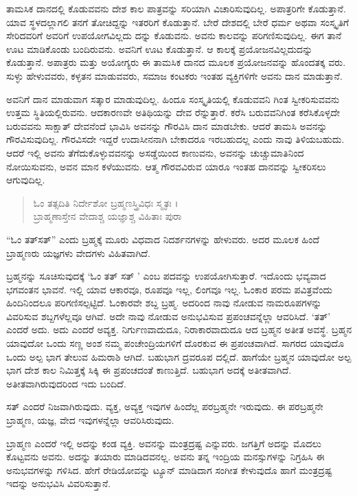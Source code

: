 ತಾಮಸಿಕ ದಾನದಲ್ಲಿ ಕೊಡುವವನು ದೇಶ ಕಾಲ ಪಾತ್ರವನ್ನು ಸರಿಯಾಗಿ ವಿಚಾರಿಸುವುದಿಲ್ಲ. ಅಪಾತ್ರರಿಗೇ ಕೊಡುತ್ತಾನೆ. ಯಾವ ಸ್ಥಳದಲ್ಲಾಗಲಿ ತನಗೆ ತೋಚಿದ್ದನ್ನು ಇತರರಿಗೆ ಕೊಡುತ್ತಾನೆ. ಬೇರೆ ದೇಶದಲ್ಲಿ ಬೇರೆ ಧರ್ಮ ಅಥವಾ ಸಂಸ್ಕೃತಿಗೆ ಸೇರಿದವರಿಗೆ ಅವರಿಗೆ ಉಪಯೋಗವಿಲ್ಲದು ದನ್ನು ಕೊಡುವನು. ಅವನು ಕಾಲವನ್ನು ಪರಿಗಣಿಸುವುದಿಲ್ಲ. ಈಗ ತಾನೆ ಊಟ ಮಾಡಿಕೊಂಡು ಬಂದಿರುವನು. ಅವನಿಗೆ ಊಟ ಕೊಡುತ್ತಾನೆ. ಆ ಕಾಲಕ್ಕೆ ಪ್ರಯೋಜನವಿಲ್ಲದುದನ್ನು ಕೊಡುತ್ತಾನೆ. ಅಪಾತ್ರರು ಮತ್ತು ಅಯೋಗ್ಯರು ಈ ತಾಮಸಿಕ ದಾನದ ಮೂಲಕ ಪ್ರಯೋಜನವನ್ನು ಹೊಂದತಕ್ಕ ವರು. ಸುಳ್ಳು ಹೇಳುವವರು, ಕಳ್ಳತನ ಮಾಡುವವರು, ಸಮಾಜ ಕಂಟಕರು ಇಂತಹ ವ್ಯಕ್ತಿಗಳಿಗೇ ಅವನು ದಾನ ಮಾಡುತ್ತಾನೆ.

ಅವನಿಗೆ ದಾನ ಮಾಡುವಾಗ ಸತ್ಕಾರ ಮಾಡುವುದಿಲ್ಲ. ಹಿಂದೂ ಸಂಸ್ಕೃತಿಯಲ್ಲಿ ಕೊಡುವವನಿ ಗಿಂತ ಸ್ವೀಕರಿಸುವವನು ಉತ್ತಮ ಸ್ಥಿತಿಯಲ್ಲಿರುವನು. ಆದಕಾರಣವೇ ಅತಿಥಿಯನ್ನು ದೇವ ರೆನ್ನುತ್ತಾರೆ. ಕರೆಸಿ ಬರುವವನಿಗಿಂತ ಕರೆಸಿಕೊಳ್ಳದೇ ಬರುವವನು ಸಾಕ್ಷಾತ್ ದೇವನೆಂದೆ ಭಾವಿಸಿ ಅವನನ್ನು ಗೌರವಿಸಿ ದಾನ ಮಾಡಬೇಕು. ಆದರೆ ತಾಮಸಿ ಅವನನ್ನು ಗೌರವಿಸುವುದಿಲ್ಲ. ಗೌರವಿಸದೇ ಇದ್ದರೆ ಉದಾಸೀನನಾಗಿ ಬೇಕಾದರೂ ಇರಬಹುದಲ್ಲ ಎಂದು ನಾವು ತಿಳಿಯಬಹುದು. ಆದರೆ ಇಲ್ಲಿ ಅವನು ತೆಗೆದುಕೊಳ್ಳುವವನನ್ನು ಅಸಡ್ಡೆಯಿಂದ ಕಾಣುವನು, ಅವನನ್ನು ಚುಚ್ಚುಮಾತಿನಿಂದ ನೋಯಿಸುವನು, ಅವನ ಮಾನ ಕಳೆಯುವನು. ಆತ್ಮ ಗೌರವವಿರುವ ಯಾರೂ ಇಂತಹ ದಾನವನ್ನು ಸ್ವೀಕರಿಸಲು ಆಗುವುದಿಲ್ಲ.

\begin{verse}
ಓಂ ತತ್ಸದಿತಿ ನಿರ್ದೇಶೋ ಬ್ರಹ್ಮಣಸ್ತ್ರಿವಿಧಃ ಸ್ಮೃತಃ ।\\ಬ್ರಾಹ್ಮಣಾಸ್ತೇನ ವೇದಾಶ್ಚ ಯಜ್ಞಾಶ್ಚ ವಿಹಿತಾಃ ಪುರಾ 
\end{verse}

{\small “ಓಂ ತತ್​ಸತ್​” ಎಂದು ಬ್ರಹ್ಮಕ್ಕೆ ಮೂರು ವಿಧವಾದ ನಿದರ್ಶನಗಳನ್ನು ಹೇಳುವರು. ಅದರ ಮೂಲಕ ಹಿಂದೆ ಬ್ರಾಹ್ಮಣರು ಯಜ್ಞಗಳು ವೇದಗಳು ವಿಹಿತವಾಗಿದೆ.}

ಬ್ರಹ್ಮನನ್ನು ಸೂಚಿಸುವುದಕ್ಕೆ ‘ಓಂ ತತ್ ಸತ್ ’ ಎಂಬ ಪದವನ್ನು ಉಪಯೋಗಿಸುತ್ತಾರೆ. ಇದೊಂದು ಭವ್ಯವಾದ ಭಗವಂತನ ಭಾವನೆ. ಇಲ್ಲಿ ಯಾವ ಆಕಾರವೂ, ರೂಪವೂ ಇಲ್ಲ, ಲಿಂಗವೂ ಇಲ್ಲ. ಓಂಕಾರ ಪರಮ ಪವಿತ್ರವೆಂದು ಹಿಂದಿನಿಂದಲೂ ಪರಿಗಣಿಸಲ್ಪಟ್ಟಿದೆ. ಓಂಕಾರವೇ ಶಬ್ದ ಬ್ರಹ್ಮ. ಅದರಿಂದ ನಾವು ನೋಡುವ ನಾಮರೂಪಗಳನ್ನು ವಿವರಿಸುವ ಶಬ್ದಗಳೆಲ್ಲವೂ ಆಗಿವೆ. ಅದೇ ನಾವು ನೋಡುವ ಅನುಭವಿಸುವ ಪ್ರಪಂಚವನ್ನೆಲ್ಲಾ ಆವರಿಸಿದೆ. ‘ತತ್​’ ಎಂದರೆ ಅದು. ಅದು ಎಂದರೆ ಅವ್ಯಕ್ತ. ನಿರ್ಗುಣವಾದುದೂ, ನಿರಾಕಾರವಾದುದೂ ಆದ ಬ್ರಹ್ಮನ ಅತೀತ ಅವಸ್ಥೆ. ಬ್ರಹ್ಮನ ಯಾವುದೋ ಒಂದು ಸಣ್ಣ ಅಂಶ ನಮ್ಮ ಪಂಚೇಂದ್ರಿಯಗಳಿಗೆ ದೊರಕುವ ಈ ಪ್ರಪಂಚವಾಗಿದೆ. ಸಾಗರದ ಯಾವುದೊ ಒಂದು ಅಲ್ಪ ಭಾಗ ತೇಲುವ ಹಿಮರಾಶಿ ಆಗಿದೆ. ಬಹುಭಾಗ ದ್ರವರೂಪ ದಲ್ಲಿದೆ. ಹಾಗೆಯೇ ಬ್ರಹ್ಮನ ಯಾವುದೋ ಅಲ್ಪ ಭಾಗ ದೇಶ ಕಾಲ ನಿಮಿತ್ತಕ್ಕೆ ಸಿಕ್ಕಿ ಈ ಪ್ರಪಂಚದಂತೆ ಕಾಣುತ್ತಿದೆ. ಬಹುಭಾಗ ಅದಕ್ಕೆ ಅತೀತವಾಗಿದೆ. ಅತೀತವಾಗಿರುವುದರಿಂದ ಇದು ಬಂದಿದೆ.

ಸತ್ ಎಂದರೆ ನಿಜವಾಗಿರುವುದು. ವ್ಯಕ್ತ, ಅವ್ಯಕ್ತ ಇವುಗಳ ಹಿಂದೆಲ್ಲ ಪರಬ್ರಹ್ಮನೇ ಇರುವುದು. ಈ ಪರಬ್ರಹ್ಮನೇ ಬ್ರಾಹ್ಮಣ, ಯಜ್ಞ, ವೇದ ಇವುಗಳನ್ನೆಲ್ಲಾ ಆವರಿಸಿರುವುದು.

ಬ್ರಾಹ್ಮಣ ಎಂದರೆ ಇಲ್ಲಿ ಅದನ್ನು ಕಂಡ ವ್ಯಕ್ತಿ. ಅವನನ್ನು ಮಂತ್ರದ್ರಷ್ಟ ಎನ್ನುವರು. ಜಗತ್ತಿಗೆ ಅದನ್ನು ಮೊದಲು ಕೊಟ್ಟವನು ಅವನು. ಅದನ್ನು ತಯಾರು ಮಾಡಿದವನಲ್ಲ. ಅವನು ತನ್ನ ಇಂದ್ರಿಯ ಮನಸ್ಸುಗಳನ್ನು ನಿಗ್ರಹಿಸಿ ಈ ಅನುಭವಗಳನ್ನು ಗಳಿಸಿದ. ಹೇಗೆ ರೇಡಿಯೋವನ್ನು ಟ್ಯೂನ್ ಮಾಡಿದಾಗ ಸಂಗೀತ ಕೇಳುವುದೊ ಹಾಗೆ ಮಂತ್ರದ್ರಷ್ಟ ಇದನ್ನು ಅನುಭವಿಸಿ ವಿವರಿಸುತ್ತಾನೆ.

